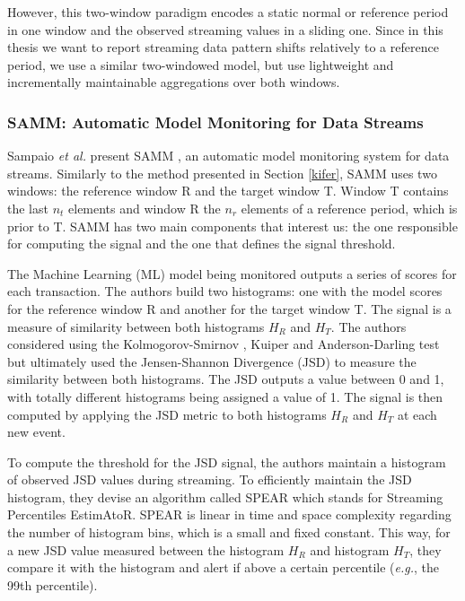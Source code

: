 However, this two-window paradigm encodes a static normal or reference period in one window and the observed streaming values in a sliding one. Since in this thesis we want to report streaming data pattern shifts relatively to a reference period, we use a similar two-windowed model, but use lightweight and incrementally maintainable aggregations over both windows.


\subsubsection{SAMM: Automatic Model Monitoring for Data Streams} \label{sec:SAMM}

Sampaio \emph{et al.} present SAMM \cite{SAMM}, an automatic model monitoring system for data streams. Similarly to the method presented in Section \ref{kifer}, SAMM uses two windows: the reference window R and the target window T. Window T contains the last $n_t$ elements and window R the $n_r$ elements of a reference period, which is prior to T. SAMM has two main components that interest us: the one responsible for computing the signal and the one that defines the signal threshold. 

The Machine Learning (ML) model being monitored outputs a series of scores for each transaction. The authors build two histograms: one with the model scores for the reference window R and another for the target window T. The signal is a measure of similarity between both histograms $H_R$ and $H_T$. The authors considered using the Kolmogorov-Smirnov \cite{KolomogorovSmirnov, Kolmogorov-Smirnov}, Kuiper \cite{KuiperTest} and Anderson-Darling \cite{AndersonDarling} test but ultimately used the Jensen-Shannon Divergence (JSD) \cite{JSD} to measure the similarity between both histograms. The JSD outputs a value between 0 and 1, with totally different histograms being assigned a value of 1. The signal is then computed by applying the JSD metric to both histograms $H_R$ and $H_T$ at each new event.

To compute the threshold for the JSD signal, the authors maintain a histogram of observed JSD values during streaming. To efficiently maintain the JSD histogram, they devise an algorithm called SPEAR which stands for Streaming Percentiles EstimAtoR. SPEAR is linear in time and space complexity regarding the number of histogram bins, which is a small and fixed constant. This way, for a new JSD value measured between the histogram $H_R$ and histogram $H_T$, they compare it with the histogram and alert if above a certain percentile (\textit{e.g.}, the 99th percentile).

